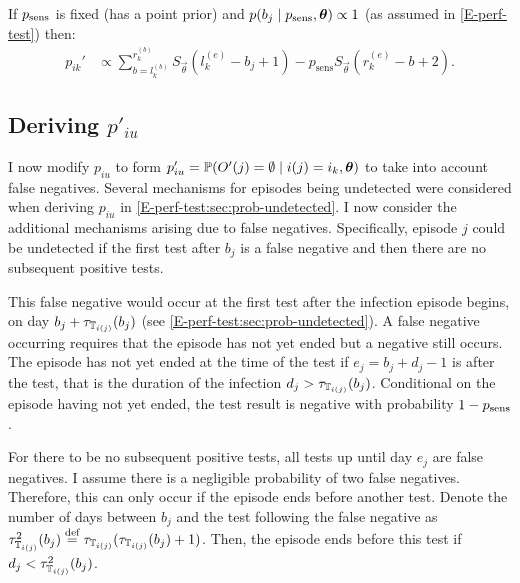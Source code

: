 \documentclass[thesis.tex]{subfiles}
\begin{document}
If $p_\text{sens}$ is fixed (\ie has a point prior) and $p(b_j \mid p_\text{sens}, \bm{\theta}) \propto 1$ (as assumed in \cref{E-perf-test}) then:
\begin{align}
p_{ik}'
&\propto \sum_{b = l_k^{(b)}}^{r_k^{(b)}} S_{\vec{\theta}}(l_k^{(e)} - b_j + 1) - p_\text{sens} S_{\vec{\theta}}(r_k^{(e)} - b + 2).
\label{imperf-test:eq:pia-prime-constant}
\end{align}

\subsection{Deriving $p'_{iu}$} \label{imperf-test:sec:modifying-p_iu}

I now modify $p_{iu}$ to form $p_{iu}' = \operatorname{\mathbb{P}}(O'(j) = \emptyset \mid i(j) = i_k, \bm{\theta})$ to take into account false negatives.
Several mechanisms for episodes being undetected were considered when deriving $p_{iu}$ in \cref{E-perf-test:sec:prob-undetected}.
I now consider the additional mechanisms arising due to false negatives.
Specifically, episode $j$ could be undetected if the first test after $b_j$ is a false negative and then there are no subsequent positive tests.

This false negative would occur at the first test after the infection episode begins, on day $b_j + \tau_{\mathbb{T}_{i(j)}}(b_j)$ (see \cref{E-perf-test:sec:prob-undetected}).
A false negative occurring requires that the episode has not yet ended but a negative still occurs.
The episode has not yet ended at the time of the test if $e_j = b_j + d_j - 1$ is after the test, that is the duration of the infection $d_j > \tau_{\mathbb{T}_{i(j)}}(b_j)$.
Conditional on the episode having not yet ended, the test result is negative with probability $1 - p_\text{sens}$.

For there to be no subsequent positive tests, all tests up until day $e_j$ are false negatives.
I assume there is a negligible probability of two false negatives.
Therefore, this can only occur if the episode ends before another test.
Denote the number of days between $b_j$ and the test following the false negative as $\tau^2_{\mathbb{T}_{i(j)}}(b_j) \stackrel{\text{def}}{=} \tau_{\mathbb{T}_{i(j)}}(\tau_{\mathbb{T}_{i(j)}}(b_j) + 1)$.
Then, the episode ends before this test if $d_j < \tau^2_{\mathbb{T}_{i(j)}}(b_j)$.
\end{document}
